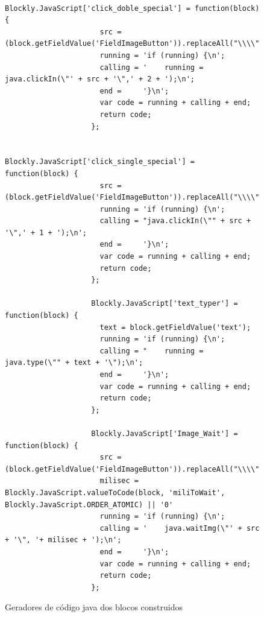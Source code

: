 \documentclass[tg]{mdtufsm}
\begin{document}
                \begin{figure}[!htb]
                \begin{lstlisting}
                    Blockly.JavaScript['click_doble_special'] = function(block) {
                      src = (block.getFieldValue('FieldImageButton')).replaceAll("\\\\","\\\\");
                      running = 'if (running) {\n';
                      calling = '    running = java.clickIn(\"' + src + '\",' + 2 + ');\n';
                      end =     '}\n';
                      var code = running + calling + end;
                      return code;
                    };

                    Blockly.JavaScript['click_single_special'] = function(block) {
                      src = (block.getFieldValue('FieldImageButton')).replaceAll("\\\\","\\\\");
                      running = 'if (running) {\n';
                      calling = "java.clickIn(\"" + src + '\",' + 1 + ');\n';
                      end =     '}\n';
                      var code = running + calling + end;
                      return code;
                    };

                    Blockly.JavaScript['text_typer'] = function(block) {
                      text = block.getFieldValue('text');
                      running = 'if (running) {\n';
                      calling = "    running = java.type(\"" + text + '\");\n';
                      end =     '}\n';
                      var code = running + calling + end;
                      return code;
                    };

                    Blockly.JavaScript['Image_Wait'] = function(block) {
                      src = (block.getFieldValue('FieldImageButton')).replaceAll("\\\\","\\\\");
                      milisec = Blockly.JavaScript.valueToCode(block, 'miliToWait', Blockly.JavaScript.ORDER_ATOMIC) || '0'
                      running = 'if (running) {\n';
                      calling = '    java.waitImg(\"' + src + '\", '+ milisec + ');\n';
                      end =     '}\n';
                      var code = running + calling + end;
                      return code;
                    };
                \end{lstlisting}
                    \caption{Geradores de código java dos blocos construidos}
                    \label{code:myBlocksGenerator.js}
                \end{figure}
\end{document}
